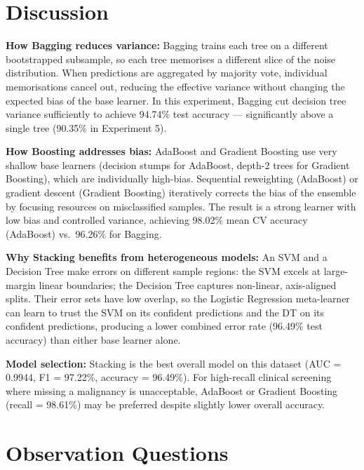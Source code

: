 \documentclass[12pt,a4paper]{article}
\begin{document}


\section{Discussion}

\textbf{How Bagging reduces variance:}
Bagging trains each tree on a different bootstrapped subsample, so each tree memorises a
different slice of the noise distribution. When predictions are aggregated by majority vote,
individual memorisations cancel out, reducing the effective variance without changing the
expected bias of the base learner. In this experiment, Bagging cut decision tree variance
sufficiently to achieve 94.74\% test accuracy --- significantly above a single tree (90.35\%
in Experiment 5).

\textbf{How Boosting addresses bias:}
AdaBoost and Gradient Boosting use very shallow base learners (decision stumps for AdaBoost,
depth-2 trees for Gradient Boosting), which are individually high-bias. Sequential reweighting
(AdaBoost) or gradient descent (Gradient Boosting) iteratively corrects the bias of the ensemble
by focusing resources on misclassified samples. The result is a strong learner with low bias and
controlled variance, achieving 98.02\% mean CV accuracy (AdaBoost) vs.\ 96.26\% for Bagging.

\textbf{Why Stacking benefits from heterogeneous models:}
An SVM and a Decision Tree make errors on different sample regions: the SVM excels at
large-margin linear boundaries; the Decision Tree captures non-linear, axis-aligned splits.
Their error sets have low overlap, so the Logistic Regression meta-learner can learn to trust
the SVM on its confident predictions and the DT on its confident predictions, producing a lower
combined error rate (96.49\% test accuracy) than either base learner alone.

\textbf{Model selection:}
Stacking is the best overall model on this dataset (AUC = 0.9944, F1 = 97.22\%, accuracy = 96.49\%).
For high-recall clinical screening where missing a malignancy is unacceptable, AdaBoost or
Gradient Boosting (recall = 98.61\%) may be preferred despite slightly lower overall accuracy.

\section{Observation Questions}
\end{document}
